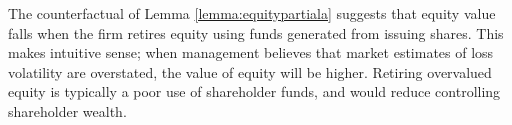 The counterfactual of Lemma \ref{lemma:equitypartiala} suggests that equity value falls when the firm retires equity using funds generated from issuing shares. This makes intuitive sense; when management believes that market estimates of loss volatility are overstated, the value of equity will be higher. Retiring overvalued equity is typically a poor use of shareholder funds, and would reduce controlling shareholder wealth.






